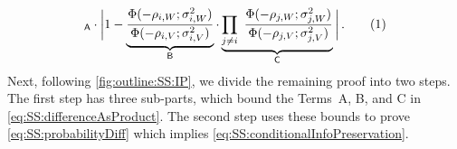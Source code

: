 \documentclass[11pt,letterpaper]{article}
\theoremstyle{plain}
\theoremstyle{definition}
\theoremstyle{remark}
\newcommand{\yesnum}{\addtocounter{equation}{1}\tag{\theequation}}
\def\biggabs#1{\bigg| #1 \bigg|}
\newcommand{\sinparen}[1]{\ensuremath{(#1)}}
\newcommand{\customcdf}[2]{\Phi\sinparen{#1; \sigma_{#2}^2}}
\begin{document}
{{\begin{align*}
{{        }}_{\textsf{A}}
        \cdot  
        \biggabs{
            1 - 
            \underbrace{\frac{
                \customcdf{-\rho_{i,W}}{i,W}
            }{
                \customcdf{-\rho_{i,V}}{i,V}
            }}_{\textsf{B}}
            \cdot 
            \underbrace{\prod_{j\neq i}~ \frac{
                \customcdf{-\rho_{j,W}}{j,W}
            }{
                \customcdf{-\rho_{j,V}}{j,V}
            }}_{\textsf{C}}
        }\,.
        \yesnum\label{eq:SS:differenceAsProduct}
    \end{align*}
    {Next, following \cref{fig:outline:SS:IP}, we divide the remaining proof into two steps.}
    {The first step has three sub-parts, which} bound the Terms~\textsf{A}, \textsf{B}, and \textsf{C} in \cref{eq:SS:differenceAsProduct}.
    {The second step} uses these bounds to prove \cref{eq:SS:probabilityDiff} which implies \cref{eq:SS:conditionalInfoPreservation}.
    
}}
\end{document}
